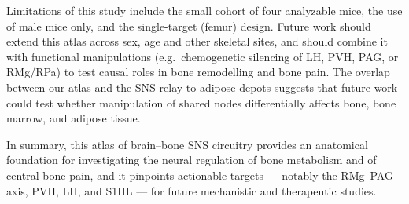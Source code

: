 \documentclass[11pt]{article}
\begin{document}
Limitations of this study include the small cohort of four analyzable mice, the use of male mice only, and the single-target (femur) design. Future work should extend this atlas across sex, age and other skeletal sites, and should combine it with functional manipulations (e.g.\ chemogenetic silencing of LH, PVH, PAG, or RMg/RPa) to test causal roles in bone remodelling and bone pain. The overlap between our atlas and the SNS relay to adipose depots \cite{ryu2014,ryu2015,bamshad1998,bamshad1999,bowers2004,shi2001,song2001,song2005b,song2008,vaughan2012,leitner2009,nguyen2014,adler2012} suggests that future work could test whether manipulation of shared nodes differentially affects bone, bone marrow, and adipose tissue.

In summary, this atlas of brain--bone SNS circuitry provides an anatomical foundation for investigating the neural regulation of bone metabolism and of central bone pain, and it pinpoints actionable targets --- notably the RMg--PAG axis, PVH, LH, and S1HL --- for future mechanistic and therapeutic studies.



\end{document}
